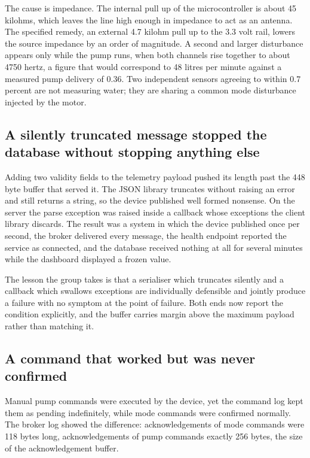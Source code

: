 The cause is impedance. The internal pull up of the microcontroller is about 45 kilohms, which leaves the line high enough in impedance to act as an antenna. The specified remedy, an external 4.7 kilohm pull up to the 3.3 volt rail, lowers the source impedance by an order of magnitude. A second and larger disturbance appears only while the pump runs, when both channels rise together to about 4750 hertz, a figure that would correspond to 48 litres per minute against a measured pump delivery of 0.36. Two independent sensors agreeing to within 0.7 percent are not measuring water; they are sharing a common mode disturbance injected by the motor.

\subsection{A silently truncated message stopped the database without stopping anything else}

Adding two validity fields to the telemetry payload pushed its length past the 448 byte buffer that served it. The JSON library truncates without raising an error and still returns a string, so the device published well formed nonsense. On the server the parse exception was raised inside a callback whose exceptions the client library discards. The result was a system in which the device published once per second, the broker delivered every message, the health endpoint reported the service as connected, and the database received nothing at all for several minutes while the dashboard displayed a frozen value.

The lesson the group takes is that a serialiser which truncates silently and a callback which swallows exceptions are individually defensible and jointly produce a failure with no symptom at the point of failure. Both ends now report the condition explicitly, and the buffer carries margin above the maximum payload rather than matching it.

\subsection{A command that worked but was never confirmed}

Manual pump commands were executed by the device, yet the command log kept them as pending indefinitely, while mode commands were confirmed normally. The broker log showed the difference: acknowledgements of mode commands were 118 bytes long, acknowledgements of pump commands exactly 256 bytes, the size of the acknowledgement buffer.


